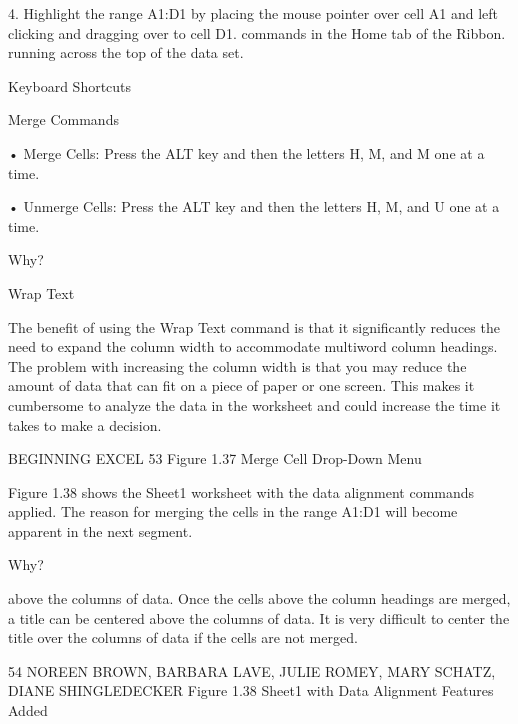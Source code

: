4. Highlight the range A1:D1 by placing the mouse pointer over cell A1 and left clicking and
dragging over to cell D1.
commands in the Home tab of the Ribbon.
running across the top of the data set.


Keyboard Shortcuts


Merge Commands


• Merge Cells: Press the ALT key and then the letters H, M, and M one at a time.

• Unmerge Cells: Press the ALT key and then the letters H, M, and U one at a time.




Why?

Wrap Text

The benefit of using the Wrap Text command is that it significantly reduces the need to expand the column width to
accommodate multiword column headings. The problem with increasing the column width is that you may reduce
the amount of data that can fit on a piece of paper or one screen. This makes it cumbersome to analyze the data in
the worksheet and could increase the time it takes to make a decision.




BEGINNING EXCEL 53
Figure 1.37 Merge Cell Drop-Down Menu




Figure 1.38 shows the Sheet1 worksheet with the data alignment commands applied. The reason for
merging the cells in the range A1:D1 will become apparent in the next segment.




Why?


above the columns of data. Once the cells above the column headings are merged, a title can be centered above the
columns of data. It is very difficult to center the title over the columns of data if the cells are not merged.




54 NOREEN BROWN, BARBARA LAVE, JULIE ROMEY, MARY SCHATZ, DIANE SHINGLEDECKER
Figure 1.38 Sheet1 with Data Alignment Features Added




